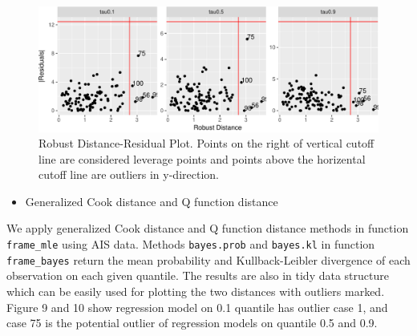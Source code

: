 \documentclass[11pt,a4paper,]{article}
\providecommand{\tightlist}{%
  \setlength{\itemsep}{0pt}\setlength{\parskip}{0pt}}
\theoremstyle{definition}
\theoremstyle{definition}
\theoremstyle{remark}
\begin{document}
\begin{figure}

{\centering \includegraphics{main_files/figure-latex/unnamed-chunk-4-1} 

}

\caption{Robust Distance-Residual Plot. Points on the right of vertical cutoff line are considered leverage points and points above the horizental cutoff line are outliers in y-direction.}\label{fig:unnamed-chunk-4}
\end{figure}

\begin{itemize}
\tightlist
\item
  Generalized Cook distance and Q function distance
\end{itemize}

We apply generalized Cook distance and Q function distance methods in
function \texttt{frame\_mle} using AIS data. Methods \texttt{bayes.prob}
and \texttt{bayes.kl} in function \texttt{frame\_bayes} return the mean
probability and Kullback-Leibler divergence of each observation on each
given quantile. The results are also in tidy data structure which can be
easily used for plotting the two distances with outliers marked. Figure
9 and 10 show regression model on 0.1 quantile has outlier case 1, and
case 75 is the potential outlier of regression models on quantile 0.5
and 0.9.
\end{document}
